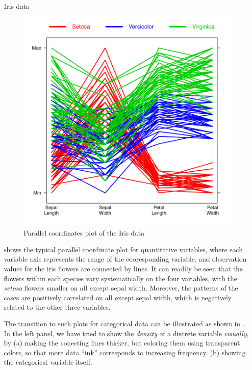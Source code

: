 \documentclass[11pt]{book}
\renewenvironment{knitrout}{\small\renewcommand{\baselinestretch}{.85}}{} %
\begin{document}
\begin{Example}[iris1]{Iris data}
\begin{knitrout}
\begin{figure}[!htbp]
\centerline{\includegraphics[width=.6\textwidth]{ch05/fig/iris1} }

\caption[Parallel coordinates plot of the Iris data]{Parallel coordinates plot of the Iris data\label{fig:iris1}}
\end{figure}


\end{knitrout}
 shows the typical parallel coordinate plot for quantitative
variables, where each variable axis represents the range of the cooresponding variable,
and observation values for the iris flowers are connected by lines.
It can readily be seen that the flowers within each species vary systematically
on the four variables, with the \emph{setosa} flowers smaller on all except
sepal width.  Moreover, the patterns of the cases are positively correlated
on all except sepal width, which is negatively related to the other three variables.

The transition to such plots for categorical data can be illustrated as shown in
.  In the left panel, we have tried to show the \emph{density}
of a discrete variable \emph{visually}, by 
(a) making the conecting lines thicker, but coloring them using transparent
colors, so that more data ``ink'' corresponds to increasing frequency.
(b) showing the categorical variable  itself.


\end{Example}
\end{document}
